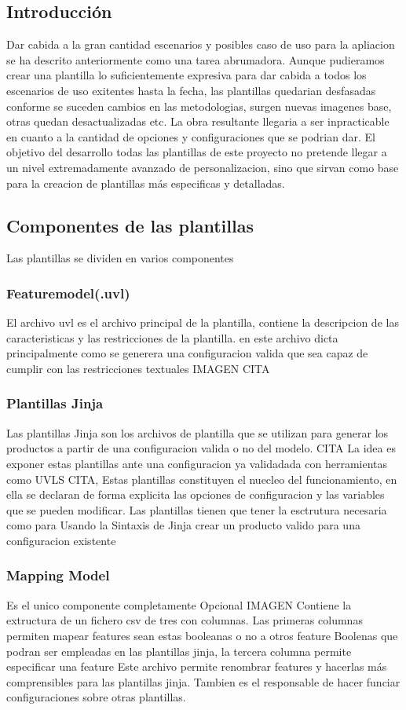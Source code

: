 \documentclass[12pt, a4paper, twoside]{article}
\begin{document}
\subsection{Introducción}
Dar cabida a la gran cantidad escenarios y posibles caso de uso para la apliacion se ha descrito anteriormente como una tarea abrumadora.
Aunque pudieramos crear una plantilla lo suficientemente expresiva para dar cabida a todos los escenarios de uso exitentes hasta la fecha, las plantillas quedarian desfasadas conforme se suceden cambios 
en las metodologias, surgen nuevas imagenes base, otras quedan desactualizadas etc. La obra resultante llegaria a ser inpracticable en cuanto a la cantidad de opciones y configuraciones que se podrian dar.
El objetivo del desarrollo todas las plantillas de este proyecto no pretende llegar a un nivel extremadamente avanzado de personalizacion, sino que sirvan como base para la creacion de plantillas más especificas y detalladas.

\subsection{Componentes de las plantillas}
Las plantillas se dividen en varios componentes 
\subsubsection{Featuremodel(.uvl)}
El archivo uvl es el archivo principal de la plantilla, contiene la descripcion de las caracteristicas y las restricciones de la plantilla.
en este archivo dicta principalmente como se generera una configuracion valida que sea capaz de cumplir con las restricciones textuales IMAGEN  CITA 
\subsubsection{Plantillas Jinja}
Las plantillas Jinja son los archivos de plantilla que se utilizan para generar los productos a partir de una configuracion valida o no del modelo. CITA
La idea es exponer estas plantillas ante una configuracion ya validadada con herramientas como UVLS CITA, Estas plantillas constituyen el nuecleo del funcionamiento, en ella se declaran de forma explicita las opciones de configuracion y las variables que se pueden modificar.
Las plantillas tienen que tener la esctrutura necesaria como para Usando la Sintaxis de Jinja crear un producto valido para una configuracion existente
\subsubsection{Mapping Model}
Es el unico componente completamente Opcional IMAGEN
Contiene la extructura de un fichero csv de tres con columnas. Las primeras columnas permiten mapear features sean estas booleanas o no a otros feature Boolenas que podran ser empleadas en las plantillas jinja, la tercera columna permite especificar una feature
Este archivo permite renombrar features y hacerlas más comprensibles para las plantillas jinja. Tambien es el responsable de hacer funciar configuraciones sobre otras plantillas.
\end{document}
